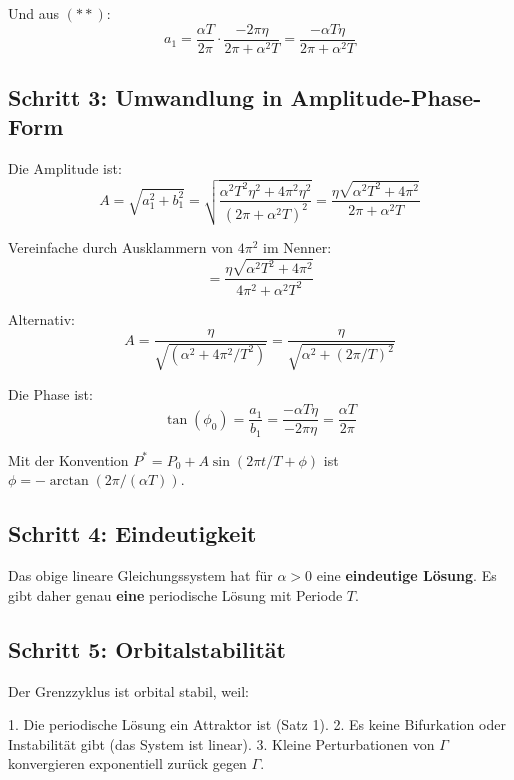 \documentclass[a4paper,11pt]{report}
\theoremstyle{definition}
\begin{document}
Und aus $(**)$:
\begin{equation}
    a_1 = \frac{\alpha T}{2\pi} \cdot \frac{-2\pi \eta}{2\pi + \alpha^2 T} = \frac{-\alpha T \eta}{2\pi + \alpha^2 T}
\end{equation}

\subsection{Schritt 3: Umwandlung in Amplitude-Phase-Form}

Die Amplitude ist:
\begin{equation}
    A = \sqrt{a_1^2 + b_1^2} = \sqrt{\frac{\alpha^2 T^2 \eta^2 + 4\pi^2 \eta^2}{(2\pi + \alpha^2 T)^2}} = \frac{\eta\sqrt{\alpha^2 T^2 + 4\pi^2}}{2\pi + \alpha^2 T}
\end{equation}

Vereinfache durch Ausklammern von $4\pi^2$ im Nenner:
\begin{equation}
    = \frac{\eta \sqrt{\alpha^2 T^2 + 4\pi^2}}{4\pi^2 + \alpha^2 T^2}
\end{equation}

Alternativ:
\begin{equation}
    A = \frac{\eta}{\sqrt{(\alpha^2 + 4\pi^2/T^2)}} = \frac{\eta}{\sqrt{\alpha^2 + (2\pi/T)^2}}
\end{equation}

Die Phase ist:
\begin{equation}
    \tan(\phi_0) = \frac{a_1}{b_1} = \frac{-\alpha T \eta}{-2\pi \eta} = \frac{\alpha T}{2\pi}
\end{equation}

Mit der Konvention $P^* = P_0 + A\sin(2\pi t/T + \phi)$ ist $\phi = -\arctan(2\pi/(\alpha T))$.

\subsection{Schritt 4: Eindeutigkeit}

Das obige lineare Gleichungssystem hat für $\alpha > 0$ eine \textbf{eindeutige Lösung}. Es gibt daher genau \textbf{eine} periodische Lösung mit Periode $T$.

\subsection{Schritt 5: Orbitalstabilität}

Der Grenzzyklus ist orbital stabil, weil:

1. Die periodische Lösung ein Attraktor ist (Satz 1).
2. Es keine Bifurkation oder Instabilität gibt (das System ist linear).
3. Kleine Perturbationen von $\Gamma$ konvergieren exponentiell zurück gegen $\Gamma$.
\end{document}

